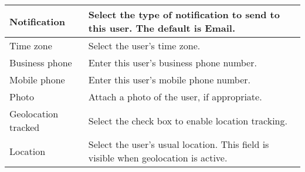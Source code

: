 \begin{table}[H]
\begin{tabular}{|p{3cm}|p{12cm}|}
\hline
Notification & Select the type of notification to send to this user. The default is Email. \\ 
\hline
Time zone & Select the user's time zone. \\ 
\hline
Business phone & Enter this user's business phone number. \\ 
\hline
Mobile phone & Enter this user's mobile phone number. \\ 
\hline
Photo & Attach a photo of the user, if appropriate. \\ 
\hline
Geolocation tracked & Select the check box to enable location tracking. \\ 
\hline
Location & Select the user's usual location. This field is visible when geolocation is active. \\ 
\hline
\end{tabular}
\end{table}